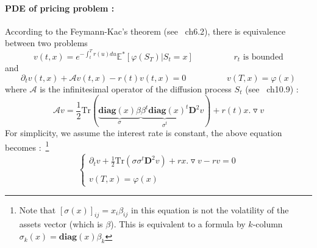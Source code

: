\documentclass[a4paper,10pt]{article}
\begin{document}
\paragraph{PDE of pricing problem :}According to the Feymann-Kac's theorem (see~\cite{Klebaner} ch6.2), there is equivalence between two problems
\[
v(t,x) = e^{ -\int_t^T r(u) du } \mathbb{E}^* [\varphi(S_T) | S_t = x]
\hspace{2cm}
r_t \text{ is bounded}
\]
and
\[
\partial_t v(t,x) + \mathcal{A} v(t,x) - r(t)v(t,x) = 0 
\hspace{2cm}
v(T,x) = \varphi(x)
\]
where $\mathcal{A}$ is the infinitesimal operator of the diffusion process $S_t$ (see~\cite{Kuo} ch10.9) :
\[
\mathcal{A} v = \frac{1}{2}\text{Tr} (\underbrace{\textbf{diag}(x) \beta}_{\sigma} \underbrace{\beta^{t}\textbf{diag}(x)^t}_{\sigma^t} \textbf{D}^2 v ) + r(t)x .\triangledown v 
\]
For simplicity, we assume the interest rate is constant, the above equation becomes :~\footnote{Note that $[\sigma(x)]_{ij} = x_i \beta_{ij}$ in this equation is not the volatility of the assets vector (which is $\beta$). This is equivalent to a formula by $k$-column $\sigma_{k}(x) = \textbf{diag}(x) \beta_{k}$}
\begin{equation}\label{eq:pde_0}
\left\{
\begin{array}{ll}
\partial_t v +\frac{1}{2} \text{Tr}(\sigma \sigma^{t} \textbf{D}^2 v ) +rx .\triangledown v - r v =0 \\ \\
v(T,x) = \varphi(x)
\end{array}
\right.
\end{equation}
\end{document}
